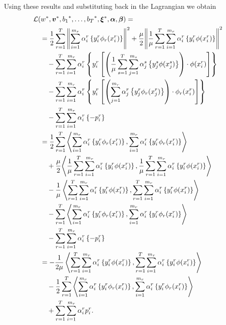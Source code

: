 Using these results and substituting back in the Lagrangian we obtain
\begin{equation}\nonumber
    \begin{aligned}
        &  \mathcal{L}({{w}}^*, {\bm{v}}^*, {b_1}^*, \ldots, {b_T}^*, {\bm{\xi}}^*, \bm{\alpha}, \bm{\beta}) =\\
        &\quad =  \frac{1}{2} \sum_{r= 1}^T{\left\lVert\sum_{i=1}^{m_r} {\alpha_i^r} \left\lbrace y_i^r \phi_r({x}_i^r) \right\rbrace\right\rVert^2} + \frac{\mu}{2} {\left\lVert \frac{1}{\mu}\sum_{r= 1}^T \sum_{i=1}^{m_r} {\alpha_i^r} \left\lbrace y_i^r \phi({x}_i^r) \right\rbrace\right\rVert}^2 \\
        &\qquad -  \sum_{r= 1}^T \sum_{i=1}^{m_r} \alpha_i^r \left\lbrace y_{i}^r \left[ \left(\frac{1}{\mu} \sum_{s= 1}^T \sum_{j=1}^{m_s} {\alpha_j^s} \left\lbrace y_j^s \phi({x}_j^s) \right\rbrace \right) \cdot \phi({x}_{i}^r) \right]  \right\rbrace \\
        &\qquad -  \sum_{r= 1}^T \sum_{i=1}^{m_r} \alpha_i^r \left\lbrace y_{i}^r \left[  \left( \sum_{j=1}^{m_r} {\alpha_j^r} \left\lbrace y_j^r \phi_r({x}_j^r) \right\rbrace \right) \cdot \phi_r({x}_{i}^r)  \right]  \right\rbrace \\
        &\qquad -  \sum_{r= 1}^T \sum_{i=1}^{m_r} \alpha_i^r \left\lbrace - p_{i}^r  \right\rbrace \\
        &\quad =  \frac{1}{2} \sum_{r= 1}^T{\left\langle \sum_{i=1}^{m_r} {\alpha_i^r} \left\lbrace y_i^r \phi_r({x}_i^r) \right\rbrace, \sum_{i=1}^{m_r} {\alpha_i^r} \left\lbrace y_i^r \phi_r({x}_i^r) \right\rbrace \right\rangle} \\
        &\qquad + \frac{\mu}{2} {\left\langle  \frac{1}{\mu}\sum_{r= 1}^T \sum_{i=1}^{m_r} {\alpha_i^r} \left\lbrace y_i^r \phi({x}_i^r) \right\rbrace,  \frac{1}{\mu}\sum_{r= 1}^T \sum_{i=1}^{m_r} {\alpha_i^r} \left\lbrace y_i^r \phi({x}_i^r) \right\rbrace \right\rangle} \\
        &\qquad - \frac{1}{\mu} \left\langle  \sum_{r= 1}^T \sum_{i=1}^{m_r} {\alpha_i^r} \left\lbrace y_i^r \phi({x}_i^r) \right\rbrace,  \sum_{r= 1}^T \sum_{i=1}^{m_r} {\alpha_i^r} \left\lbrace y_i^r \phi({x}_i^r) \right\rbrace \right\rangle \\
        &\qquad -  \sum_{r= 1}^T {\left\langle \sum_{i=1}^{m_r} {\alpha_i^r} \left\lbrace y_i^r \phi_r({x}_i^r) \right\rbrace, \sum_{i=1}^{m_r} {\alpha_i^r} \left\lbrace y_i^r \phi_r({x}_i^r) \right\rbrace \right\rangle} \\
        &\qquad -  \sum_{r= 1}^T \sum_{i=1}^{m_r} \alpha_i^r \left\lbrace - p_{i}^r  \right\rbrace \\
        &\quad = - \frac{1}{2\mu} \left\langle  \sum_{r= 1}^T \sum_{i=1}^{m_r} {\alpha_i^r} \left\lbrace y_i^r \phi({x}_i^r) \right\rbrace,  \sum_{r= 1}^T \sum_{i=1}^{m_r} {\alpha_i^r} \left\lbrace y_i^r \phi({x}_i^r) \right\rbrace \right\rangle \\
        &\qquad - \frac{1}{2} \sum_{r= 1}^T {\left\langle \sum_{i=1}^{m_r} {\alpha_i^r} \left\lbrace y_i^r \phi_r({x}_i^r) \right\rbrace, \sum_{i=1}^{m_r} {\alpha_i^r} \left\lbrace y_i^r \phi_r({x}_i^r) \right\rbrace \right\rangle} \\
        &\qquad +  \sum_{r= 1}^T \sum_{i=1}^{m_r} \alpha_i^r  p_{i}^r .
    \end{aligned}
\end{equation}
